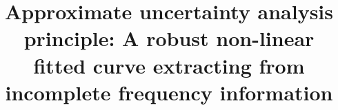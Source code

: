 \documentclass{sig-alternate}
\begin{document}
%

\title{Approximate uncertainty analysis principle: A robust non-linear fitted curve extracting from incomplete frequency information}
%
%
%
%
%
\end{document}
